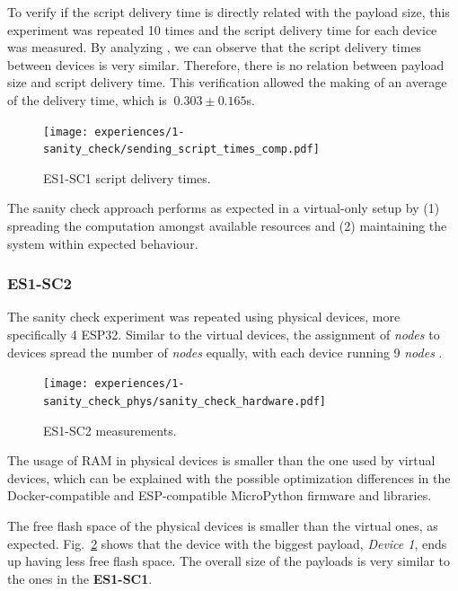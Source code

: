 To verify if the script delivery time is directly related with the payload size, this experiment was repeated 10 times and the script delivery time for each device was measured. By analyzing , we can observe that the script delivery times between devices is very similar. Therefore, there is no relation between payload size and script delivery time. This verification allowed the making of an average of the delivery time, which is $~0.303\pm0.165$s. 

\begin{figure}[h]
\centering
\texttt{[image: experiences/1-sanity\_check/sending\_script\_times\_comp.pdf]}
\caption[ES1-SC1 delivery times.]{ES1-SC1 script delivery times.}\label{fig:delivery_times_comp}
\end{figure}

The sanity check approach performs as expected in a virtual-only setup by (1) spreading the computation amongst available resources and (2) maintaining the system within expected behaviour.


\subsubsection{ES1-SC2}\label{sec:sanity_check_phys_exp}

The sanity check experiment was repeated using physical devices, more specifically 4 ESP32. Similar to the virtual devices, the assignment of \textit{nodes} to devices spread the number of \textit{nodes} equally, with each device running 9 \textit{nodes} .

\begin{figure}[h]
\centering
\texttt{[image: experiences/1-sanity\_check\_phys/sanity\_check\_hardware.pdf]}
\caption[ES1-SC2 measurements.]{ES1-SC2 measurements.}\label{fig:sanity_check_phys_graph}
\end{figure}

The usage of RAM in physical devices is smaller than the one used by virtual devices, which can be explained with the possible optimization differences in the Docker-compatible and ESP-compatible MicroPython firmware and libraries.

The free flash space of the physical devices is smaller than the virtual ones, as expected. Fig.~\ref{fig:sanity_check_phys_graph} shows that the device with the biggest payload, \textit{Device 1}, ends up having less free flash space. The overall size of the payloads is very similar to the ones in the \textbf{ES1-SC1}.

